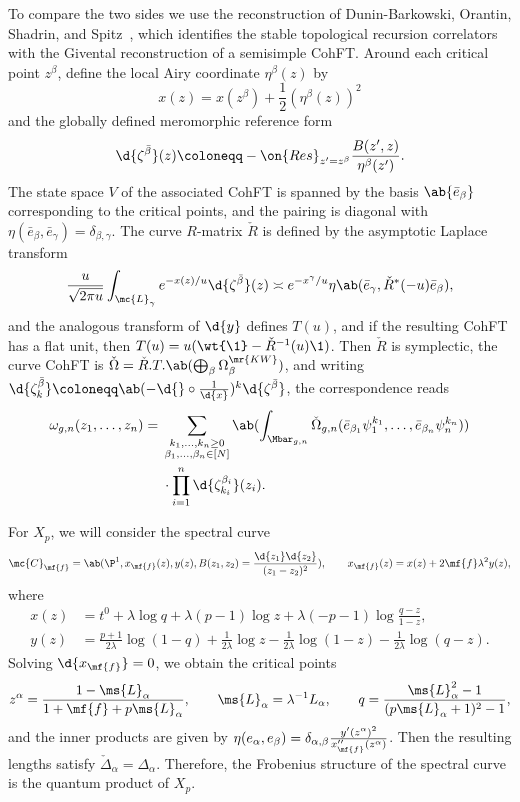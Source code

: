 To compare the two sides we use the reconstruction of Dunin-Barkowski, Orantin, Shadrin, and Spitz~\cite{DOSS2014}, which identifies the stable topological recursion correlators with the Givental reconstruction of a semisimple CohFT. Around each critical point \(z^{\beta}\), define the local Airy coordinate \(\eta^{\beta}(z)\) by
\[ x(z) = x(z^{\beta}) + \frac{1}{2}(\eta^{\beta}(z))^2 \]
and the globally defined meromorphic reference form
\[ \d{\zeta^{\bar{\beta}}}(z) \coloneqq -\on{Res}_{z'=z^{\beta}}\frac{B(z',z)}{\eta^{\beta}(z')}. \]
The state space \(V\) of the associated CohFT is spanned by the basis \(\ab\{\bar{e}_{\beta}\}\) corresponding to the critical points, and the pairing is diagonal with \(\eta(\bar{e}_{\beta},\bar{e}_{\gamma}) = \delta_{\beta,\gamma}\). The curve \(R\)-matrix \(\check{R}\) is defined by the asymptotic Laplace transform
\[ \frac{u}{\sqrt{2\pi u}}\int_{\mc{L}_{\gamma}} e^{-x(z)/u}\d{\zeta^{\bar{\beta}}}(z) \asymp e^{-x^{\gamma}/u}\eta\ab(\bar{e}_{\gamma}, \check{R}^*(-u)\bar{e}_{\beta}), \]
and the analogous transform of \(\d{y}\) defines \(T(u)\), and if the resulting CohFT has a flat unit, then \(T(u) = u(\wt{\1}-\check{R}^{-1}(u)\1)\). Then \(\check{R}\) is symplectic, the curve CohFT is \(\check{\Omega} = \check{R}.T.\ab(\bigoplus_{\beta}\Omega^{\mr{KW}}_{\beta})\), and writing \(\d{\zeta^{\bar{\beta}}_k} \coloneqq \ab(-\d{} \circ \frac{1}{\d{x}})^k \d{\zeta^{\bar{\beta}}}\), the correspondence reads
\begin{align*}
    \omega_{g,n}(z_1,\ldots,z_n) ={}& \sum_{\substack{k_1,\ldots,k_n \geq 0 \\ \beta_1,\ldots,\beta_n \in [N]}}\ab(\int_{\Mbar_{g,n}} \check{\Omega}_{g,n}(\bar{e}_{\beta_1}\psi_1^{k_1},\ldots,\bar{e}_{\beta_n}\psi_n^{k_n})) \\
    &\cdot \prod_{i=1}^n \d{\zeta^{\beta_i}_{k_i}}(z_i).
\end{align*}

For \(X_p\), we will consider the spectral curve
\[ \mc{C}_{\mf{f}} = \ab(\P^1, x_{\mf{f}}(z), y(z), B(z_1,z_2) = \frac{\d{z_1}\d{z_2}}{(z_1-z_2)^2}), \qquad x_{\mf{f}}(z) = x(z) + 2\mf{f}\lambda^2 y(z), \]
where
\begin{align*}
    x(z) &= t^0 + \lambda \log q + \lambda(p-1)\log z + \lambda(-p-1)\log\frac{q-z}{1-z}, \\
    y(z) &= \frac{p+1}{2\lambda}\log(1-q) + \frac{1}{2\lambda}\log z - \frac{1}{2\lambda}\log(1-z) - \frac{1}{2\lambda}\log(q-z).
\end{align*}
Solving \(\d{x_{\mf{f}}} = 0\), we obtain the critical points
\[ z^{\alpha} = \frac{1-\ms{L}_{\alpha}}{1+\mf{f}+p\ms{L}_{\alpha}}, \qquad \ms{L}_{\alpha} = \lambda^{-1}L_{\alpha}, \qquad q = \frac{\ms{L}_{\alpha}^2-1}{(p\ms{L}_{\alpha}+1)^2-1}, \]
and the inner products are given by \(\eta(e_{\alpha},e_{\beta}) = \delta_{\alpha,\beta}\frac{y'(z^{\alpha})^2}{x''_{\mf{f}}(z^{\alpha})}\). Then the resulting lengths satisfy \(\check{\Delta}_{\alpha} = \Delta_{\alpha}\). Therefore, the Frobenius structure of the spectral curve is the quantum product of \(X_p\).

